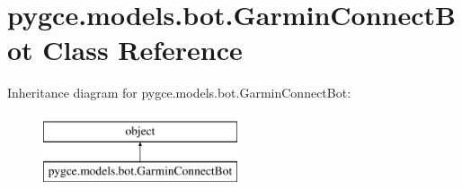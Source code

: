 \hypertarget{classpygce_1_1models_1_1bot_1_1_garmin_connect_bot}{}\section{pygce.\+models.\+bot.\+Garmin\+Connect\+Bot Class Reference}
\label{classpygce_1_1models_1_1bot_1_1_garmin_connect_bot}
Inheritance diagram for pygce.\+models.\+bot.\+Garmin\+Connect\+Bot\+:\begin{figure}[H]
\begin{center}
\leavevmode
\includegraphics[height=2.000000cm]{classpygce_1_1models_1_1bot_1_1_garmin_connect_bot}
\end{center}
\end{figure}

